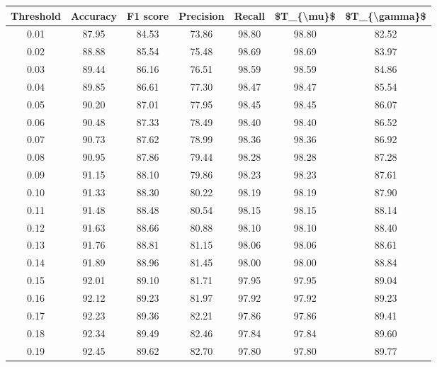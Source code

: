 \begin{tabular}{|c|c|c|c|c|c|c|}
\hline
 Threshold &  Accuracy &  F1 score &  Precision &  Recall &  \$T\_\{\textbackslash mu\}\$ &  \$T\_\{\textbackslash gamma\}\$ \\
\hline
      0.01 &     87.95 &     84.53 &      73.86 &   98.80 &      98.80 &         82.52 \\
      0.02 &     88.88 &     85.54 &      75.48 &   98.69 &      98.69 &         83.97 \\
      0.03 &     89.44 &     86.16 &      76.51 &   98.59 &      98.59 &         84.86 \\
      0.04 &     89.85 &     86.61 &      77.30 &   98.47 &      98.47 &         85.54 \\
      0.05 &     90.20 &     87.01 &      77.95 &   98.45 &      98.45 &         86.07 \\
      0.06 &     90.48 &     87.33 &      78.49 &   98.40 &      98.40 &         86.52 \\
      0.07 &     90.73 &     87.62 &      78.99 &   98.36 &      98.36 &         86.92 \\
      0.08 &     90.95 &     87.86 &      79.44 &   98.28 &      98.28 &         87.28 \\
      0.09 &     91.15 &     88.10 &      79.86 &   98.23 &      98.23 &         87.61 \\
      0.10 &     91.33 &     88.30 &      80.22 &   98.19 &      98.19 &         87.90 \\
      0.11 &     91.48 &     88.48 &      80.54 &   98.15 &      98.15 &         88.14 \\
      0.12 &     91.63 &     88.66 &      80.88 &   98.10 &      98.10 &         88.40 \\
      0.13 &     91.76 &     88.81 &      81.15 &   98.06 &      98.06 &         88.61 \\
      0.14 &     91.89 &     88.96 &      81.45 &   98.00 &      98.00 &         88.84 \\
      0.15 &     92.01 &     89.10 &      81.71 &   97.95 &      97.95 &         89.04 \\
      0.16 &     92.12 &     89.23 &      81.97 &   97.92 &      97.92 &         89.23 \\
      0.17 &     92.23 &     89.36 &      82.21 &   97.86 &      97.86 &         89.41 \\
      0.18 &     92.34 &     89.49 &      82.46 &   97.84 &      97.84 &         89.60 \\
      0.19 &     92.45 &     89.62 &      82.70 &   97.80 &      97.80 &         89.77 \\

\end{tabular}
